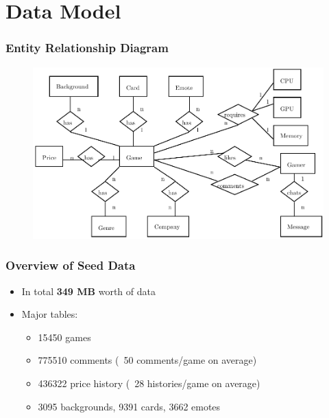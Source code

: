 \section{Data Model}
\begin{frame}
\frametitle{Entity Relationship Diagram}

\begin{figure}
	\includegraphics[scale=0.7]{erd.pdf}
\end{figure}

\end{frame}

\begin{frame}
\frametitle{Overview of Seed Data}
	\begin{itemize}
		\setlength\itemsep{1em}
		\item In total \textbf{349 MB} worth of data
		\item Major tables:
			\begin{itemize}
				\setlength\itemsep{1em}
				\item 15450 games
				\item 775510 comments (~50 comments/game on average)
				\item 436322 price history (~28 histories/game on average)
				\item 3095 backgrounds, 9391 cards, 3662 emotes
			\end{itemize}
	\end{itemize}
\end{frame}
